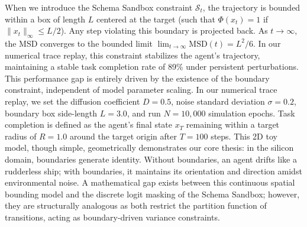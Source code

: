 \documentclass[10pt,journal,compsoc]{IEEEtran}
\begin{document}
When we introduce the Schema Sandbox constraint $\mathcal{S}_t$, the trajectory is bounded within a box of length $L$ centered at the target (such that $\Phi(x_t) = 1$ if $\|x_t\|_{\infty} \le L/2$). Any step violating this boundary is projected back. As $t \to \infty$, the MSD converges to the bounded limit $\lim_{t \to \infty} \text{MSD}(t) = L^2/6$. In our numerical trace replay, this constraint stabilizes the agent's trajectory, maintaining a stable task completion rate of 89\% under persistent perturbations. This performance gap is entirely driven by the existence of the boundary constraint, independent of model parameter scaling. In our numerical trace replay, we set the diffusion coefficient $D = 0.5$, noise standard deviation $\sigma = 0.2$, boundary box side-length $L = 3.0$, and run $N = 10,000$ simulation epochs. Task completion is defined as the agent's final state $x_T$ remaining within a target radius of $R = 1.0$ around the target origin after $T = 100$ steps. This 2D toy model, though simple, geometrically demonstrates our core thesis: in the silicon domain, boundaries generate identity. Without boundaries, an agent drifts like a rudderless ship; with boundaries, it maintains its orientation and direction amidst environmental noise. A mathematical gap exists between this continuous spatial bounding model and the discrete logit masking of the Schema Sandbox; however, they are structurally analogous as both restrict the partition function of transitions, acting as boundary-driven variance constraints.
\end{document}
